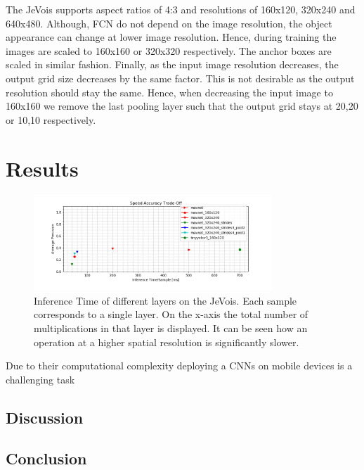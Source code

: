 The JeVois supports aspect ratios of 4:3 and resolutions of 160x120, 320x240 and 640x480. Although, \ac{FCN} do not depend on the image resolution, the object appearance can change at lower image resolution. Hence, during training the images are scaled to 160x160 or 320x320 respectively. The anchor boxes are scaled in similar fashion. Finally, as the input image resolution decreases, the output grid size decreases by the same factor. This is not desirable as the output resolution should stay the same. Hence, when decreasing the input image to 160x160 we remove the last pooling layer such that the output grid stays at 20,20 or 10,10 respectively.

\section{Results}

\begin{figure}[hbtp]
	\centering
	\includegraphics[width=0.8\textwidth]{fig/ap_speed_tradeoff}
	\caption{Inference Time of different layers on the JeVois. Each sample corresponds to a single layer. On the x-axis the total number of multiplications in that layer is displayed. It can be seen how an operation at a higher spatial resolution is significantly slower.}
	\label{fig:ap_speed_tradeoff}
\end{figure}

Due to their computational complexity deploying a \acp{CNN} on mobile devices is a challenging task



\subsection{Discussion}


\subsection{Conclusion}







